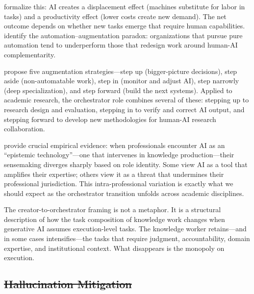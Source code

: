 \documentclass{article}
\providecommand{\DIFdeltex}[1]{{\protect\color{red}\sout{#1}}}                      %
\providecommand{\DIFdelbegin}{} %
\providecommand{\DIFdel}[1]{\texorpdfstring{\DIFdeltex{#1}}{}} %
\newcommand{\DIFscaledelfig}{0.5}
\newlength{\DIFdelgraphicswidth} %
\newlength{\DIFdelgraphicsheight} %
\newcommand{\DIFdelincludegraphics}[2][]{%
\sbox{\DIFdelgraphicsbox}{\DIFOincludegraphics[#1]{#2}}%
\settoboxwidth{\DIFdelgraphicswidth}{\DIFdelgraphicsbox} %
\settoboxtotalheight{\DIFdelgraphicsheight}{\DIFdelgraphicsbox} %
\scalebox{\DIFscaledelfig}{%
\parbox[b]{\DIFdelgraphicswidth}{\usebox{\DIFdelgraphicsbox}\\[-\baselineskip] \rule{\DIFdelgraphicswidth}{0em}}\llap{\resizebox{\DIFdelgraphicswidth}{\DIFdelgraphicsheight}{%
\setlength{\unitlength}{\DIFdelgraphicswidth}%
\begin{picture}(1,1)%
\thicklines\linethickness{2pt} %
{\color[rgb]{1,0,0}\put(0,0){\framebox(1,1){}}}%
{\color[rgb]{1,0,0}\put(0,0){\line( 1,1){1}}}%
{\color[rgb]{1,0,0}\put(0,1){\line(1,-1){1}}}%
\end{picture}%
}\hspace*{3pt}}} %
} %
\DeclareRobustCommand{\DIFdelbegin}{\DIFOdelbegin \let\includegraphics\DIFdelincludegraphics} %
\begin{document}
\citet{acemoglu2018automation} formalize this: AI creates a displacement effect (machines substitute for labor in tasks) and a productivity effect (lower costs create new demand). The net outcome depends on whether new tasks emerge that require human capabilities. \citet{raisch2021ai} identify the automation--augmentation paradox: organizations that pursue pure automation tend to underperform those that redesign work around human-AI complementarity.

\citet{davenport2016just} propose five augmentation strategies---step up (bigger-picture decisions), step aside (non-automatable work), step in (monitor and adjust AI), step narrowly (deep specialization), and step forward (build the next systems). Applied to academic research, the orchestrator role combines several of these: stepping up to research design and evaluation, stepping in to verify and correct AI output, and stepping forward to develop new methodologies for human-AI research collaboration.

\citet{scarbrough2024epistemic} provide crucial empirical evidence: when professionals encounter AI as an ``epistemic technology''---one that intervenes in knowledge production---their sensemaking diverges sharply based on role identity. Some view AI as a tool that amplifies their expertise; others view it as a threat that undermines their professional jurisdiction. This intra-professional variation is exactly what we should expect as the orchestrator transition unfolds across academic disciplines.

The creator-to-orchestrator framing is not a metaphor. It is a structural description of how the task composition of knowledge work changes when generative AI assumes execution-level tasks. The knowledge worker retains---and in some cases intensifies---the tasks that require judgment, accountability, domain expertise, and institutional context. What disappears is the monopoly on execution.

\DIFdelbegin %

\subsection{\DIFdel{Hallucination Mitigation}}
\addtocounter{subsection}{-1}%
\end{document}
